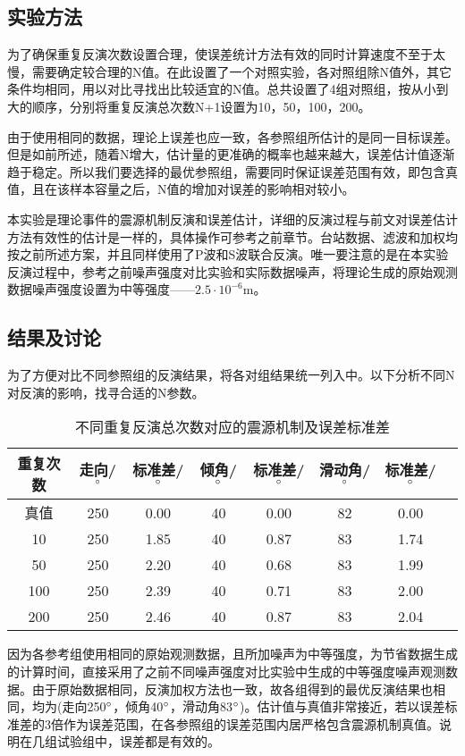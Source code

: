 \subsection{实验方法}
为了确保重复反演次数设置合理，使误差统计方法有效的同时计算速度不至于太慢，需要确定较合理的N值。在此设置了一个对照实验，各对照组除N值外，其它条件均相同，用以对比寻找出比较适宜的N值。总共设置了4组对照组，按从小到大的顺序，分别将重复反演总次数N+1设置为10，50，100，200。

由于使用相同的数据，理论上误差也应一致，各参照组所估计的是同一目标误差。但是如前所述，随着N增大，估计量的更准确的概率也越来越大，误差估计值逐渐趋于稳定。所以我们要选择的最优参照组，需要同时保证误差范围有效，即包含真值，且在该样本容量之后，N值的增加对误差的影响相对较小。

本实验是理论事件的震源机制反演和误差估计，详细的反演过程与前文对误差估计方法有效性的估计是一样的，具体操作可参考之前章节。台站数据、滤波和加权均按之前所述方案，并且同样使用了P波和S波联合反演。唯一要注意的是在本实验反演过程中，参考之前噪声强度对比实验和实际数据噪声，将理论生成的原始观测数据噪声强度设置为中等强度——$2.5\cdot10^{-6}$m。

\subsection{结果及讨论}
为了方便对比不同参照组的反演结果，将各对组结果统一列入中。以下分析不同N对反演的影响，找寻合适的N参数。
\begin{table}[ht]
\centering
\caption{不同重复反演总次数对应的震源机制及误差标准差}
\label{tab3_07}
    \begin{tabular}{c c c c c c c c}
    \hline
    重复次数 & 走向/$^\circ$ & 标准差/$^\circ$ & 倾角/$^\circ$ & 标准差/$^\circ$ & 滑动角/$^\circ$ & 标准差/$^\circ$\\
    \hline
    真值		& 250 & 0.00 & 40 & 0.00 & 82 & 0.00 \\
    10			& 250 & 1.85 & 40 & 0.87 & 83 & 1.74 \\
    50			& 250 & 2.20 & 40 & 0.68 & 83 & 1.99 \\
    100		& 250 & 2.39 & 40 & 0.71 & 83 & 2.00 \\
    200		& 250 & 2.46 & 40 & 0.87 & 83 & 2.04 \\
    \hline
    \end{tabular}
\end{table}

因为各参考组使用相同的原始观测数据，且所加噪声为中等强度，为节省数据生成的计算时间，直接采用了之前不同噪声强度对比实验中生成的中等强度噪声观测数据。由于原始数据相同，反演加权方法也一致，故各组得到的最优反演结果也相同，均为(走向250$^\circ$，倾角40$^\circ$，滑动角83$^\circ$)。估计值与真值非常接近，若以误差标准差的3倍作为误差范围，在各参照组的误差范围内居严格包含震源机制真值。说明在几组试验组中，误差都是有效的。

